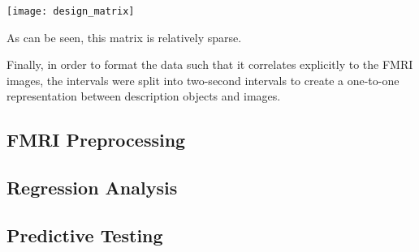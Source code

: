 \centerline{\texttt{[image: design\_matrix]}}

\par As can be seen, this matrix is relatively sparse.
\par Finally, in order to format the data such that it correlates explicitly
to the FMRI images, the intervals were split into two-second intervals
to create a one-to-one representation between description objects and images.


\subsection{FMRI Preprocessing}

\subsection{Regression Analysis}

\subsection{Predictive Testing}

